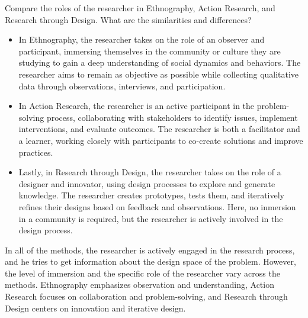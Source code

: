 \begin{ejercicio}
    Compare the roles of the researcher in Ethnography, Action Research, and Research through Design. What are the similarities and differences?
    \begin{itemize}
        \item In Ethnography, the researcher takes on the role of an observer and participant, immersing themselves in the community or culture they are studying to gain a deep understanding of social dynamics and behaviors. The researcher aims to remain as objective as possible while collecting qualitative data through observations, interviews, and participation.

        \item In Action Research, the researcher is an active participant in the problem-solving process, collaborating with stakeholders to identify issues, implement interventions, and evaluate outcomes. The researcher is both a facilitator and a learner, working closely with participants to co-create solutions and improve practices.

        \item Lastly, in Research through Design, the researcher takes on the role of a designer and innovator, using design processes to explore and generate knowledge. The researcher creates prototypes, tests them, and iteratively refines their designs based on feedback and observations. Here, no inmersion in a community is required, but the researcher is actively involved in the design process.
    \end{itemize}

    In all of the methods, the researcher is actively engaged in the research process, and he tries to get information about the design space of the problem. However, the level of immersion and the specific role of the researcher vary across the methods. Ethnography emphasizes observation and understanding, Action Research focuses on collaboration and problem-solving, and Research through Design centers on innovation and iterative design.
\end{ejercicio}

